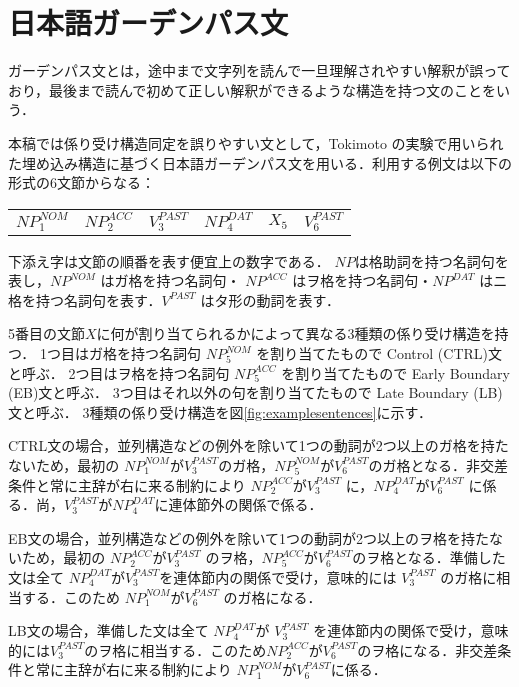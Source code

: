 \documentclass[japanese]{jnlp_1.4}
\begin{document}
\section{日本語ガーデンパス文} \label{sec:3}


ガーデンパス文とは，途中まで文字列を読んで一旦理解されやすい解釈が誤っており，最後まで読んで初めて正しい解釈ができるような構造を持つ文のことをいう．

本稿では係り受け構造同定を誤りやすい文として，Tokimoto \cite{Tokimoto04}の実験で用いられた埋め込み構造に基づく日本語ガーデンパス文を用いる．利用する例文は以下の形式の6文節からなる：

\begin{center}
\begin{tabular}{p{2cm}p{2cm}p{2cm}p{2cm}p{2cm}p{2cm}} 
$NP_{1}^{NOM}$ & $NP_{2}^{ACC}$ & $V_{3}^{PAST}$ & $NP_{4}^{DAT}$ & $X_{5}$ & $V_{6}^{PAST}$ \\
\end{tabular}
\end{center}

下添え字は文節の順番を表す便宜上の数字である．
$NP$は格助詞を持つ名詞句を表し，$NP^{NOM}$ はガ格を持つ名詞句・ $NP^{ACC}$ はヲ格を持つ名詞句・$NP^{DAT}$ はニ格を持つ名詞句を表す．$V^{PAST}$ はタ形の動詞を表す．

5番目の文節$X$に何が割り当てられるかによって異なる3種類の係り受け構造を持つ．
1つ目はガ格を持つ名詞句 $NP_{5}^{NOM}$ を割り当てたもので Control (CTRL)文と呼ぶ．
2つ目はヲ格を持つ名詞句 $NP_{5}^{ACC}$ を割り当てたもので Early Boundary (EB)文と呼ぶ．
3つ目はそれ以外の句を割り当てたもので Late Boundary (LB)文と呼ぶ．
3種類の係り受け構造を図\ref{fig:examplesentences}に示す．

CTRL文の場合，並列構造などの例外を除いて1つの動詞が2つ以上のガ格を持たないため，最初の $NP_{1}^{NOM}$が$V_{3}^{PAST}$のガ格，$NP_{5}^{NOM}$が$V_{6}^{PAST}$のガ格となる．非交差条件と常に主辞が右に来る制約により $NP_{2}^{ACC}$が$V_{3}^{PAST}$ に，$NP_{4}^{DAT}$が$V_{6}^{PAST}$ に係る．尚，$V_{3}^{PAST}$が$NP_{4}^{DAT}$に連体節外の関係\cite{Teramura1981}で係る．

EB文の場合，並列構造などの例外を除いて1つの動詞が2つ以上のヲ格を持たないため，最初の $NP_{2}^{ACC}$が$V_{3}^{PAST}$ のヲ格，$NP_{5}^{ACC}$が$V_{6}^{PAST}$のヲ格となる．準備した文は全て $NP_{4}^{DAT}$が$V_{3}^{PAST} $を連体節内の関係で受け，意味的には $V_{3}^{PAST}$ のガ格に相当する．このため $NP_{1}^{NOM}$が$V_{6}^{PAST}$ のガ格になる．

LB文の場合，準備した文は全て $NP_{4}^{DAT}$が $V_{3}^{PAST}$ を連体節内の関係で受け，意味的には$V_{3}^{PAST}$のヲ格に相当する．このため$NP_{2}^{ACC}$が$V_{6}^{PAST}$のヲ格になる．非交差条件と常に主辞が右に来る制約により $NP_{1}^{NOM}$が$V_{6}^{PAST}$に係る．
\end{document}
